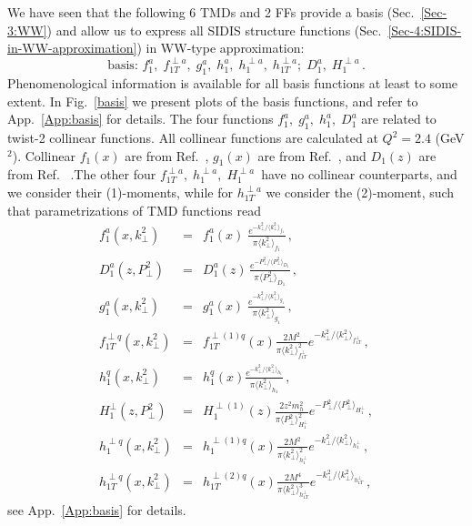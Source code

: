 \documentclass[a4paper,11pt]{article}
\newcommand{\be}{\begin{equation}}
\newcommand{\ee}{\end{equation}}
\newcommand{\ba}{\begin{eqnarray}}
\newcommand{\ea}{\end{eqnarray}}
\newcommand{\la}{\langle}
\newcommand{\ra}{\rangle}
\def\kperp{k_\perp}
\def\pperp{P_\perp}
\def\avkperp{\la \kperp^2 \ra}
\def\avpperp{\la \pperp^2 \ra}
\begin{document}
We have seen that the following 6 TMDs and 2 FFs provide a basis 
(Sec.~\ref{Sec-3:WW}) and allow us to express all SIDIS structure 
functions (Sec.~\ref{Sec-4:SIDIS-in-WW-approximation})  
in WW-type approximation: 
\be\label{Eq:basis}
   \mbox{basis: \ \ } 
   f_1^a, \; f_{1T}^{\perp a}, \; g_1^a, \; h_1^a, \;h_1^{\perp a},\; h_{1T}^{\perp a};
   \; D_1^a, \; H_1^{\perp a} \, .
\ee
Phenomenological information is available for all basis functions at 
least to some extent. 
In Fig.~\ref{basis} we present plots of the basis functions, and refer
to App.~\ref{App:basis} for details.
The four functions $f_1^a, \; g_1^a, \; h_1^a,\; D_1^a$  
are related to twist-2 collinear functions. All collinear functions are calculated at $Q^2 = 2.4$ (GeV$^2$). Collinear $f_1(x)$ are from Ref.~\cite{Martin:2009iq},  $g_1(x)$ are from Ref.~\cite{Gluck:1998xa}, and $D_1(z)$ are from Ref. ~\cite{deFlorian:2007aj}.The other four 
$f_{1T}^{\perp a},  \;h_1^{\perp a},\; H_1^{\perp a} \,$  
have no collinear counterparts, and we consider their (1)-moments, while 
for $ h_{1T}^{\perp a}$  we consider the (2)-moment,
such that parametrizations of TMD functions read
\begin{subequations}\ba
f^a_1(x,\kperp^2) &=& f^a_1(x)\;
    \frac{e^{-\kperp^2/\avkperp_{f_1}}}{\pi\avkperp_{f_1}} \, ,\\
    D^a_1(z,\pperp^2) &=& D_1^a(z)\,
    \frac{e^{-\pperp^2/\avpperp_{D_1}}}{\pi\avpperp_{D_1}} \, ,\\
g^a_1(x,\kperp^2) &=& g^a_1(x)\;
    \frac{e^{-\kperp^2/\avkperp_{g_1}}}{\pi\avkperp_{g_1}} \, ,\\    
f_{1T}^{\perp q}(x,\kperp^2) &=&  f_{1T}^{\perp (1) q}(x)   \frac{2 M^2}{\pi \avkperp_{f_{1T}^\perp}^2} e^{-\kperp^2/{\avkperp_{f_{1T}^\perp}}} \, ,\\
h_{1}^{q} (x, \kperp^2) &=&h_{1}^{q} (x)  \frac{e^{-{\kperp^2}/{\avkperp_{h_1} }}}{\pi \avkperp_{h_1}}\, ,\\
H_{1}^{\perp}(z,\pperp^2) &=&  H_{1}^{\perp (1)}(z)   \frac{2 z^2 m_h^2}{\pi \avpperp_{H_{1}^\perp}^2} e^{-\pperp^2/{\avpperp_{H_{1}^\perp}}}\, ,\\
h_{1}^{\perp q}(x,\kperp^2) &=&  h_{1}^{\perp (1) q}(x)   \frac{2 M^2}{\pi \avkperp_{h_{1}^\perp}^2} e^{-\kperp^2/{\avkperp_{h_{1}^\perp}}}\, ,\\
h_{1T}^{\perp q}(x,\kperp^2) &=&  h_{1T}^{\perp (2) q}(x)   \frac{2 M^4}{\pi \avkperp_{h_{1T}^\perp}^3} e^{-\kperp^2/{\avkperp_{h_{1T}^\perp}}} \, ,
\ea\end{subequations}
see App.~\ref{App:basis} for details.
\end{document}
